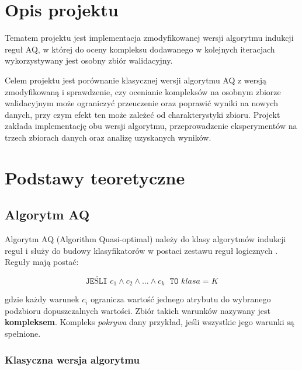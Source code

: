\documentclass[12pt,a4paper]{article}
\begin{document}


\newpage
\tableofcontents
\newpage

\section{Opis projektu}

Tematem projektu jest implementacja zmodyfikowanej wersji algorytmu indukcji reguł AQ,
w której do oceny kompleksu dodawanego w kolejnych iteracjach wykorzystywany jest
osobny zbiór walidacyjny.

Celem projektu jest porównanie klasycznej wersji algorytmu AQ z wersją zmodyfikowaną
i sprawdzenie, czy ocenianie kompleksów na osobnym zbiorze walidacyjnym może ograniczyć
przeuczenie oraz poprawić wyniki na nowych danych, przy czym efekt ten może zależeć
od charakterystyki zbioru.
Projekt zakłada implementację obu wersji algorytmu, przeprowadzenie eksperymentów
na trzech zbiorach danych oraz analizę uzyskanych wyników.

\section{Podstawy teoretyczne}

\subsection{Algorytm AQ}

Algorytm AQ (Algorithm Quasi-optimal) należy do klasy algorytmów indukcji reguł
i służy do budowy klasyfikatorów w postaci zestawu reguł logicznych
\cite{michalski1969, michalski1983}.
Reguły mają postać:

\[
\texttt{JEŚLI } c_1 \wedge c_2 \wedge \ldots \wedge c_k \;\texttt{ TO } \mathit{klasa} = K
\]

gdzie każdy warunek $c_i$ ogranicza wartość jednego atrybutu do wybranego podzbioru
dopuszczalnych wartości.
Zbiór takich warunków nazywany jest \textbf{kompleksem}.
Kompleks \emph{pokrywa} dany przykład, jeśli wszystkie jego warunki są spełnione.

\subsubsection*{Klasyczna wersja algorytmu}
\end{document}
